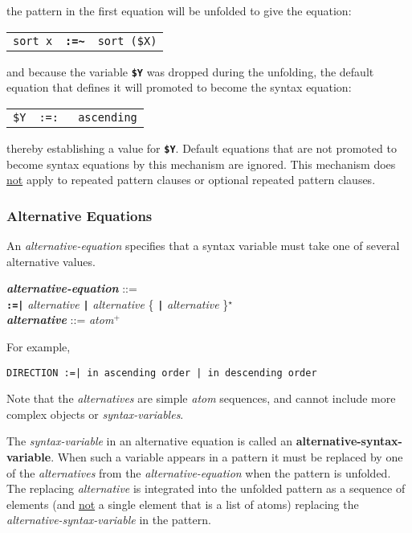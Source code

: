 \documentclass[12pt]{article}
\newcommand{\TT}[1]{{\tt \bfseries #1}}
\newcommand{\key}[1]{{\rm \bfseries #1}}
\newcommand{\emkey}[1]{{\em \bfseries #1}}
\newcommand{\STAR}{{\Large $^\star$}}
\newcommand{\PLUS}[1][]{{$^{+#1}$}}
\newcommand{\TILDE}{\textasciitilde}
\newenvironment{indpar}[1][0.3in]%
	{\begin{list}{}%
		     {\setlength{\itemsep}{0in}%
		      \setlength{\topsep}{0in}%
		      \setlength{\parsep}{1ex}%
		      \setlength{\labelwidth}{#1}%
		      \setlength{\leftmargin}{#1}%
		      \addtolength{\leftmargin}{\labelsep}}%
	 \item}%
	{\end{list}}
\begin{document}
the pattern in the first equation will be unfolded to give the equation:

\begin{center}
\begin{tabular}{rcl}
\verb/sort x/ & \TT{:=\TILDE} & \verb/sort ($X)/ \\
\end{tabular}
\end{center}

and because the variable \TT{\$Y} was dropped during the unfolding,
the default equation that defines it will promoted to become the syntax
equation:

\begin{center}
\begin{tabular}{rcl}
\verb/$Y/ & \tt :=: & \verb|ascending|
\end{tabular}
\end{center}

thereby establishing a value for \TT{\$Y}.  Default equations that
are not promoted to become syntax equations by this mechanism are
ignored.  This mechanism does \underline{not} apply to repeated pattern
clauses or optional repeated pattern clauses.

\subsubsection{Alternative Equations}
\label{ALTERNATIVE-EQUATIONS}

An {\em alternative-equation} specifies that a syntax variable must take
one of several alternative values.

\begin{indpar}
\emkey{alternative-equation} ::= \\
\hspace*{3em}{\em syntax-variable}
		\TT{:=|} {\em alternative}
		          \TT{|} {\em alternative}
			  \{ \TT{|} {\em alternative} \}\STAR{}
		\\[1ex]
\emkey{alternative} ::= {\em atom}\PLUS{}
\end{indpar}

For example,
\begin{center}
\verb/DIRECTION :=| in ascending order | in descending order/
\end{center}

Note that the {\em alternatives} are simple {\em atom} sequences,
and cannot include more complex objects or {\em syntax-var\-i\-ables}.

The {\em syntax-variable} in an alternative equation is called an
\key{alternative-syntax-variable}.  When such a variable appears
in a pattern it must be replaced by one of the {\em alternatives}
from the {\em alternative-equation} when the pattern is unfolded.
The replacing {\em alternative} is integrated into the unfolded
pattern as a sequence of elements (and \underline{not} a single element that
is a list of atoms) replacing the {\em alternative-syntax-variable}
in the pattern.
\end{document}
